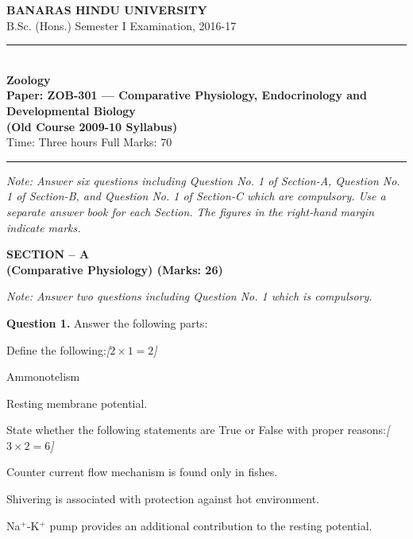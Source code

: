 \documentclass[11pt,a4paper]{article}
\newcommand{\pts}[1]{\hfill   \textit{[#1]}}
\begin{document}
\begin{center}
  {\large\bfseries BANARAS HINDU UNIVERSITY}\\[2pt]
  {\normalsize B.Sc. (Hons.) Semester I Examination, 2016-17}\\[6pt]
  \rule{0.8\linewidth}{0.5pt}\\[6pt]
  {\large\bfseries Zoology}\\[4pt]
  {\large\bfseries Paper: ZOB-301 --- Comparative Physiology, Endocrinology and Developmental Biology}\\[2pt]
  {\normalsize   \textbf{(Old Course 2009-10 Syllabus)}}\\[4pt]
  {\normalsize Time: Three hours \hfill Full Marks: 70}
\end{center}

\rule{\linewidth}{0.4pt}

\smallskip



\noindent   \textit{Note: Answer six questions including Question No. 1 of Section-A, Question No. 1 of Section-B, and Question No. 1 of Section-C which are compulsory. Use a separate answer book for each Section. The figures in the right-hand margin indicate marks.}

\bigskip

\begin{center}
   \textbf{SECTION -- A} \\
   \textbf{(Comparative Physiology) (Marks: 26)}
\end{center}

\smallskip



\noindent   \textit{Note: Answer two questions including Question No. 1 which is compulsory.}

\medskip


\noindent   \textbf{Question 1.} Answer the following parts:

\begin{parts}
  \item Define the following:\pts{$2  \times 1 = 2$}
  
\begin{parts}
    \item Ammonotelism
    \item Resting membrane potential.
  \end{parts}

  \item State whether the following statements are True or False with proper reasons:\pts{$3  \times 2 = 6$}
  
\begin{parts}
    \item Counter current flow mechanism is found only in fishes.
    \item Shivering is associated with protection against hot environment.
    \item Na$^+$-K$^+$ pump provides an additional contribution to the resting potential.
  \end{parts}
\end{parts}
\end{document}
